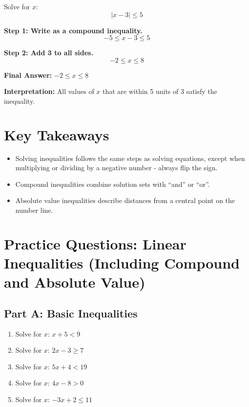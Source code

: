 \documentclass[14pt]{extarticle}
\begin{document}
Solve for \(x\):
\[
|x - 3| \le 5
\]

\textbf{Step 1: Write as a compound inequality.}
\[
-5 \le x - 3 \le 5
\]

\textbf{Step 2: Add 3 to all sides.}
\[
-2 \le x \le 8
\]

\textbf{Final Answer:} \(\boxed{-2 \le x \le 8}\)

\textbf{Interpretation:} All values of \(x\) that are within 5 units of 3 satisfy the inequality.

\section*{Key Takeaways}
\begin{itemize}
    \item Solving inequalities follows the same steps as solving equations, except when multiplying or dividing by a negative number - always flip the sign.
    \item Compound inequalities combine solution sets with “and” or “or”.
    \item Absolute value inequalities describe distances from a central point on the number line.
\end{itemize}
\newpage


\section*{Practice Questions: Linear Inequalities (Including Compound and Absolute Value)}

\subsection*{Part A: Basic Inequalities}
\begin{enumerate}
    \item Solve for \(x\): \(x + 5 < 9\)
    \item Solve for \(x\): \(2x - 3 \ge 7\)
    \item Solve for \(x\): \(5x + 4 < 19\)
    \item Solve for \(x\): \(4x - 8 > 0\)
    \item Solve for \(x\): \(-3x + 2 \le 11\)
\end{enumerate}
\end{document}
